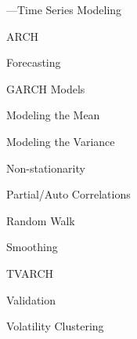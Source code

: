 %
\begin{minipage}{0.40\textwidth}
\noindent ---Time Series Modeling
	\begin{flushright}
	ARCH \par
	Forecasting \par
	GARCH Models \par
	Modeling the Mean \par
	Modeling the Variance \par
	Non-stationarity \par
	Partial/Auto Correlations \par
	Random Walk \par
	Smoothing \par
	TVARCH \par
	Validation \par
	Volatility Clustering 
	\end{flushright}
\vfill
\end{minipage}








	

